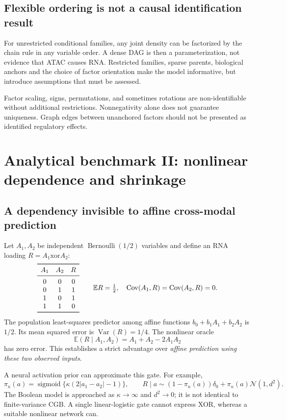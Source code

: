 \documentclass[11pt,a4paper]{article}
\newcommand{\E}{\mathbb E}
\newcommand{\N}{\mathcal N}
\newcommand{\Var}{\operatorname{Var}}
\newcommand{\Cov}{\operatorname{Cov}}
\newcommand{\sigmoid}{\operatorname{sigmoid}}
\numberwithin{equation}{section}
\begin{document}
\subsection{Flexible ordering is not a causal identification result}
For unrestricted conditional families, any joint density can be
factorized by the chain rule in any variable order. A dense DAG is then a
parameterization, not evidence that ATAC causes RNA.
Restricted families, sparse parents, biological anchors and the choice
of factor orientation make the model informative, but introduce
assumptions that must be assessed.

Factor scaling, signs, permutations, and sometimes rotations are
non-identifiable without additional restrictions. Nonnegativity alone
does not guarantee uniqueness. Graph edges between unanchored factors
should not be presented as identified regulatory effects.

\clearpage
\section{Analytical benchmark II: nonlinear dependence and shrinkage}

\subsection{A dependency invisible to affine cross-modal prediction}
Let \(A_1,A_2\) be independent \(\operatorname{Bernoulli}(1/2)\) variables
and define an RNA loading \(R=A_1\mathbin{\mathrm{xor}}A_2\):
\[
\begin{array}{ccc}
\toprule A_1&A_2&R\\ \midrule
0&0&0\\0&1&1\\1&0&1\\1&1&0\\ \bottomrule
\end{array}
\qquad
\E R=\tfrac12,\quad
\Cov(A_1,R)=\Cov(A_2,R)=0.
\]
The population least-squares predictor among affine functions
\(b_0+b_1A_1+b_2A_2\) is \(1/2\). Its mean squared error is
\(\Var(R)=1/4\). The nonlinear oracle
\[
\E(R\mid A_1,A_2)=A_1+A_2-2A_1A_2
\]
has zero error. This establishes a strict advantage over
\emph{affine prediction using these two observed inputs}.

A neural activation prior can approximate this gate. For example,
\[
\pi_\kappa(a)=\sigmoid\{\kappa(2|a_1-a_2|-1)\},\qquad
R\mid a\sim(1-\pi_\kappa(a))\delta_0+
\pi_\kappa(a)\N(1,d^2).
\]
The Boolean model is approached as \(\kappa\to\infty\) and \(d^2\to0\);
it is not identical to finite-variance CGB. A single linear-logistic
gate cannot express XOR, whereas a suitable nonlinear network can.
\end{document}
